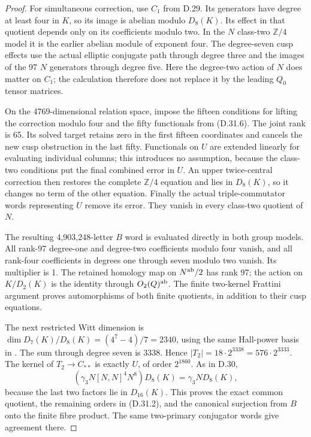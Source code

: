 \begin{proof}
For simultaneous correction, use $C_1$ from D.29.
Its generators have degree at least four in $K$,
so its image is abelian modulo $D_8(K)$. Its effect
in that quotient depends only on its coefficients
modulo two. In the $N$ class-two $\mathbb Z/4$ model
it is the earlier abelian module of exponent four.
The degree-seven cusp effects use the actual elliptic
conjugate path through degree three and the images of
the 97 $N$ generators through degree five. Here the
degree-two action of $N$ does matter on $C_1$; the
calculation therefore does not replace it by the
leading $Q_0$ tensor matrices.

On the 4769-dimensional relation space, impose the
fifteen conditions for lifting the correction
modulo four and the fifty functionals from (D.31.6).
The joint rank is 65. Its solved target retains zero
in the first fifteen coordinates and cancels the
new cusp obstruction in the last fifty. Functionals
on $U$ are extended linearly for evaluating individual
columns; this introduces no assumption, because the
class-two conditions put the final combined error
in $U$. An upper twice-central correction then
restores the complete $\mathbb Z/4$ equation and
lies in $D_8(K)$, so it changes no term of the other
equation. Finally the actual triple-commutator words
representing $U$ remove its error. They vanish in
every class-two quotient of $N$.

The resulting 4,903,248-letter $B$ word is evaluated
directly in both group models. All rank-97 degree-one
and degree-two coefficients modulo four vanish,
and all rank-four coefficients in degrees one
through seven modulo two vanish. Its multiplier is 1.
The retained homology map on $N^{\rm ab}/2$ has
rank 97; the action on $K/D_2(K)$ is the identity
through $O_2(Q)^{\rm ab}$. The finite two-kernel
Frattini argument proves automorphisms of both
finite quotients, in addition to their cusp equations.

The next restricted Witt dimension is
$\dim D_7(K)/D_8(K)=(4^7-4)/7=2340$, using the same
Hall-power basis in \cite[Proposition 4.4]{dEfrat2023}.
The sum through degree seven is 3338. Hence
$|T_2|=18\cdot2^{3338}=576\cdot2^{3333}$.
The kernel of $T_2\to C_{**}$ is exactly $U$,
of order $2^{1860}$. As in D.30,
\[
 (\gamma_3N[N,N]^4N^8)D_8(K)=\gamma_3N D_8(K),         \tag{D.31.7}
\]
because the last two factors lie in $D_{16}(K)$.
This proves the exact common quotient, the remaining
orders in (D.31.2), and the canonical surjection
from $B$ onto the finite fibre product. The same
two-primary conjugator words give agreement there.


\end{proof}
